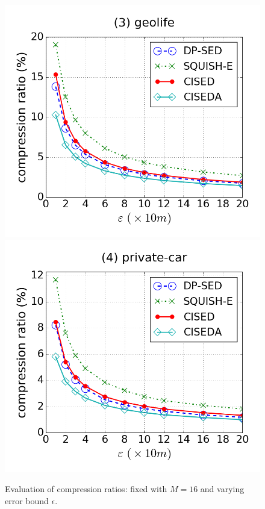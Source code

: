 \begin{figure}[tb!]
\includegraphics[scale = 0.250]{figures/Exp-cr-epsilon-geolife.png}
\includegraphics[scale = 0.250]{figures/Exp-cr-epsilon-private.png}
\vspace{-2ex}
\caption{\small Evaluation of compression ratios: fixed with $M=16$ and varying error bound $\epsilon$.}
\label{fig:cr-m20}
\vspace{-2.0ex}
\end{figure}


